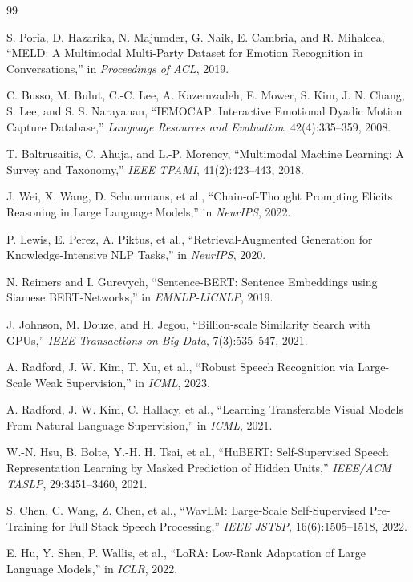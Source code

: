 \documentclass[11pt,a4paper,twocolumn]{article}
\begin{document}
\begin{thebibliography}{99}

S. Poria, D. Hazarika, N. Majumder, G. Naik, E. Cambria, and R. Mihalcea,
``MELD: A Multimodal Multi-Party Dataset for Emotion Recognition in Conversations,''
in \emph{Proceedings of ACL}, 2019.

C. Busso, M. Bulut, C.-C. Lee, A. Kazemzadeh, E. Mower, S. Kim, J. N. Chang,
S. Lee, and S. S. Narayanan,
``IEMOCAP: Interactive Emotional Dyadic Motion Capture Database,''
\emph{Language Resources and Evaluation}, 42(4):335--359, 2008.

T. Baltrusaitis, C. Ahuja, and L.-P. Morency,
``Multimodal Machine Learning: A Survey and Taxonomy,''
\emph{IEEE TPAMI}, 41(2):423--443, 2018.

J. Wei, X. Wang, D. Schuurmans, et al.,
``Chain-of-Thought Prompting Elicits Reasoning in Large Language Models,''
in \emph{NeurIPS}, 2022.

P. Lewis, E. Perez, A. Piktus, et al.,
``Retrieval-Augmented Generation for Knowledge-Intensive NLP Tasks,''
in \emph{NeurIPS}, 2020.

N. Reimers and I. Gurevych,
``Sentence-BERT: Sentence Embeddings using Siamese BERT-Networks,''
in \emph{EMNLP-IJCNLP}, 2019.

J. Johnson, M. Douze, and H. Jegou,
``Billion-scale Similarity Search with GPUs,''
\emph{IEEE Transactions on Big Data}, 7(3):535--547, 2021.

A. Radford, J. W. Kim, T. Xu, et al.,
``Robust Speech Recognition via Large-Scale Weak Supervision,''
in \emph{ICML}, 2023.

A. Radford, J. W. Kim, C. Hallacy, et al.,
``Learning Transferable Visual Models From Natural Language Supervision,''
in \emph{ICML}, 2021.

W.-N. Hsu, B. Bolte, Y.-H. H. Tsai, et al.,
``HuBERT: Self-Supervised Speech Representation Learning by Masked Prediction of Hidden Units,''
\emph{IEEE/ACM TASLP}, 29:3451--3460, 2021.

S. Chen, C. Wang, Z. Chen, et al.,
``WavLM: Large-Scale Self-Supervised Pre-Training for Full Stack Speech Processing,''
\emph{IEEE JSTSP}, 16(6):1505--1518, 2022.

E. Hu, Y. Shen, P. Wallis, et al.,
``LoRA: Low-Rank Adaptation of Large Language Models,''
in \emph{ICLR}, 2022.


\end{thebibliography}
\end{document}
